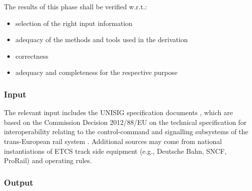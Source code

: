 \documentclass{template/openetcs_article}
\begin{document}
The results of this phase shall be verified w.r.t.:
\begin{itemize}
\item selection of the right input information
\item adequacy of the methods and tools used in the derivation
\item correctness
\item adequacy and completeness for the respective purpose
\end{itemize}
 

\subsubsection{Input}
\label{sec:1-input}

The relevant input includes the UNISIG specification documents
\cite{subset-026:3.3.0, subset-034:3.0.0, subset-076:2.3,
  subset-088:2.3.0, subset-091:3.2.0}, which are based on the
Commission Decision 2012/88/EU on the technical specification for
interoperability relating to the control-command and signalling
subsystems of the trans-European rail system
\cite{unisig_CCS}. Additional sources may come from national
instantiations of ETCS track side equipment (e.g., Deutsche Bahn,
SNCF, ProRail) and operating rules.

\subsubsection{Output}
\label{sec:1-output}
\end{document}
